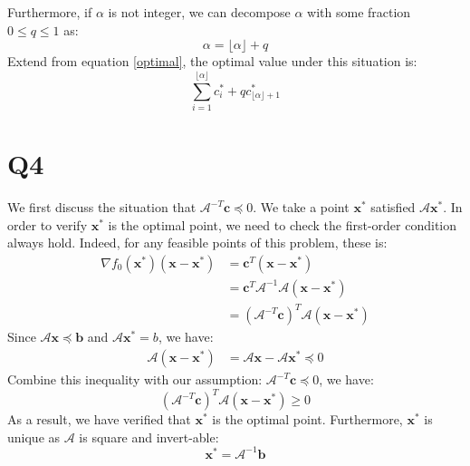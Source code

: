 \documentclass[10pt,a4paper]{article}
\begin{document}
Furthermore, if $\alpha$ is not integer, we can decompose $\alpha$ with some fraction $0 \leq q \leq 1$ as:
\begin{equation*}
	\alpha = \lfloor \alpha \rfloor + q
\end{equation*}
Extend from equation \ref{optimal}, the optimal value under this situation is: 
\begin{equation}
	\displaystyle\sum_{i = 1}^{\lfloor \alpha \rfloor}c^{*}_{i} + q c^{*}_{\lfloor \alpha \rfloor + 1}
\end{equation}

\section*{Q4}
We first discuss the situation that $\mathcal{A}^{-T} \mathbf{c} \preceq 0$. We take a point $\mathbf{x}^{*}$ satisfied $\mathcal{A} \mathbf{x}^{*}$. In order to verify $\mathbf{x}^{*}$ is the optimal point, we need to check the first-order condition always hold. Indeed, for any feasible points of this problem, these is:
\begin{equation}
	\begin{aligned}
	\nabla f_{0}(\mathbf{x}^{*})(\mathbf{x} - \mathbf{x}^{*}) &= \mathbf{c}^{T}(\mathbf{x} - \mathbf{x}^{*}) \\
	&= \mathbf{c}^{T} \mathcal{A}^{-1} \mathcal{A} (\mathbf{x} - \mathbf{x}^{*}) \\
	&= (\mathcal{A}^{-T} \mathbf{c})^{T} \mathcal{A} (\mathbf{x} - \mathbf{x}^{*})
	\end{aligned}
\end{equation}
Since $\mathcal{A} \mathbf{x} \preceq \mathbf{b}$ and $\mathcal{A} \mathbf{x}^{*} = b$, we have:
\begin{equation}
	\begin{aligned}
		\mathcal{A}(\mathbf{x} - \mathbf{x}^{*}) &= \mathcal{A} \mathbf{x} - \mathcal{A} \mathbf{x}^{*} \preceq 0
	\end{aligned}
\end{equation}
Combine this inequality with our assumption: $\mathcal{A}^{-T} \mathbf{c} \preceq 0$, we have:
\begin{equation}
	(\mathcal{A}^{-T} \mathbf{c})^{T} \mathcal{A} (\mathbf{x} - \mathbf{x}^{*}) \geq 0
\end{equation}
As a result, we have verified that $\mathbf{x}^{*}$ is the optimal point. Furthermore, $\mathbf{x}^{*}$ is unique as $\mathcal{A}$ is square and invert-able:
\begin{equation}
	\mathbf{x}^{*} = \mathcal{A}^{-1} \mathbf{b}
\end{equation}
\end{document}
